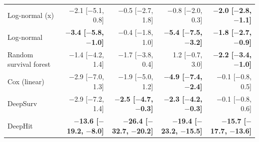 \begin{table}[htbp]
\begin{tabular}{lrrrr}
Log-normal (x) & $-$2.1 [$-$5.1, 0.8] & $-$0.5 [$-$2.7, 1.8] & $-$0.8 [$-$2.0, 0.3] & \textbf{$-$2.0 [$-$2.8, $-$1.1]} \\
Log-normal & \textbf{$-$3.4 [$-$5.8, $-$1.0]} & $-$0.4 [$-$1.8, 1.0] & \textbf{$-$5.4 [$-$7.5, $-$3.2]} & \textbf{$-$1.8 [$-$2.7, $-$0.9]} \\
Random survival forest & $-$1.4 [$-$4.2, 1.4] & $-$1.7 [$-$3.8, 0.4] & 1.2 [$-$0.7, 3.0] & \textbf{$-$2.2 [$-$3.4, $-$1.0]} \\
Cox (linear) & $-$2.9 [$-$7.0, 1.3] & $-$1.9 [$-$5.0, 1.2] & \textbf{$-$4.9 [$-$7.4, $-$2.4]} & $-$0.1 [$-$0.8, 0.5] \\
DeepSurv & $-$2.9 [$-$7.2, 1.4] & \textbf{$-$2.5 [$-$4.7, $-$0.3]} & \textbf{$-$2.3 [$-$4.2, $-$0.3]} & $-$0.1 [$-$0.8, 0.6] \\
DeepHit & \textbf{$-$13.6 [$-$19.2, $-$8.0]} & \textbf{$-$26.4 [$-$32.7, $-$20.2]} & \textbf{$-$19.4 [$-$23.2, $-$15.5]} & \textbf{$-$15.7 [$-$17.7, $-$13.6]} \\
\bottomrule
\end{tabular}
\end{table}
